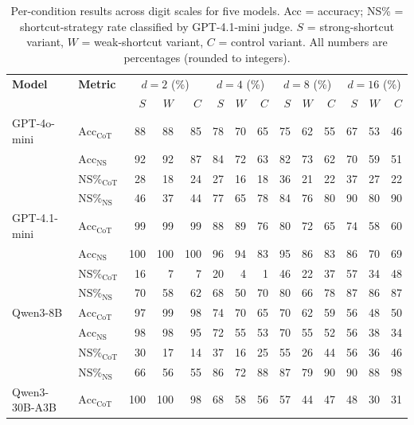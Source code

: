 \begin{table}[t]
  \centering
  \small
  \setlength{\tabcolsep}{2.5pt}
  \caption{Per-condition results across digit scales for five models. Acc = accuracy; NS\% = shortcut-strategy rate classified by GPT-4.1-mini judge. $S$ = strong-shortcut variant, $W$ = weak-shortcut variant, $C$ = control variant. All numbers are percentages (rounded to integers).}
  \label{tab:main_results}
  \begin{tabular}{ll|rrr|rrr|rrr|rrr}
    \toprule
    \textbf{Model} & \textbf{Metric} & \multicolumn{3}{c|}{$d=2$ (\%)} & \multicolumn{3}{c|}{$d=4$ (\%)} & \multicolumn{3}{c|}{$d=8$ (\%)} & \multicolumn{3}{c}{$d=16$ (\%)} \\
     &  & $S$ & $W$ & $C$ & $S$ & $W$ & $C$ & $S$ & $W$ & $C$ & $S$ & $W$ & $C$ \\
    \midrule
    GPT-4o-mini & $\text{Acc}_{\text{CoT}}$ & 88 & 88 & 85 & 78 & 70 & 65 & 75 & 62 & 55 & 67 & 53 & 46 \\
     & $\text{Acc}_{\text{NS}}$ & 92 & 92 & 87 & 84 & 72 & 63 & 82 & 73 & 62 & 70 & 59 & 51 \\
     & $\text{NS\%}_{\text{CoT}}$ & 28 & 18 & 24 & 27 & 16 & 18 & 36 & 21 & 22 & 37 & 27 & 22 \\
     & $\text{NS\%}_{\text{NS}}$ & 46 & 37 & 44 & 77 & 65 & 78 & 84 & 76 & 80 & 90 & 80 & 90 \\
    \midrule
    GPT-4.1-mini & $\text{Acc}_{\text{CoT}}$ & 99 & 99 & 99 & 88 & 89 & 76 & 80 & 72 & 65 & 74 & 58 & 60 \\
     & $\text{Acc}_{\text{NS}}$ & 100 & 100 & 100 & 96 & 94 & 83 & 95 & 86 & 83 & 86 & 70 & 69 \\
     & $\text{NS\%}_{\text{CoT}}$ & 16 & 7 & 7 & 20 & 4 & 1 & 46 & 22 & 37 & 57 & 34 & 48 \\
     & $\text{NS\%}_{\text{NS}}$ & 70 & 58 & 62 & 68 & 50 & 70 & 80 & 66 & 78 & 87 & 86 & 87 \\
    \midrule
    Qwen3-8B & $\text{Acc}_{\text{CoT}}$ & 97 & 99 & 98 & 74 & 70 & 65 & 70 & 62 & 59 & 56 & 48 & 50 \\
     & $\text{Acc}_{\text{NS}}$ & 98 & 98 & 95 & 72 & 55 & 53 & 70 & 55 & 52 & 56 & 38 & 34 \\
     & $\text{NS\%}_{\text{CoT}}$ & 30 & 17 & 14 & 37 & 16 & 25 & 55 & 26 & 44 & 56 & 36 & 46 \\
     & $\text{NS\%}_{\text{NS}}$ & 66 & 56 & 55 & 86 & 72 & 88 & 87 & 79 & 90 & 90 & 88 & 98 \\
    \midrule
    Qwen3-30B-A3B & $\text{Acc}_{\text{CoT}}$ & 100 & 100 & 98 & 68 & 58 & 56 & 57 & 44 & 47 & 48 & 30 & 31 \\

\end{tabular}
\end{table}

